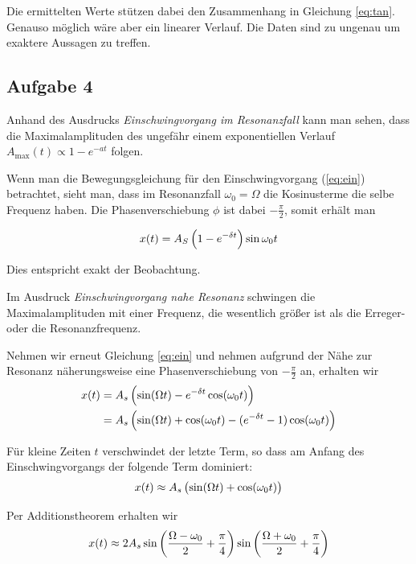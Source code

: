 \documentclass[a4paper,german,12pt,smallheadings]{scrartcl}
\begin{document}
Die ermittelten Werte stützen dabei den Zusammenhang in Gleichung \ref{eq:tan}.
Genauso möglich wäre aber ein linearer Verlauf. Die Daten sind zu ungenau um
exaktere Aussagen zu treffen.

\subsection{Aufgabe 4}
Anhand des Ausdrucks \textit{Einschwingvorgang im Resonanzfall} kann man sehen,
dass die Maximalamplituden des ungefähr einem exponentiellen Verlauf
$A_\text{max}(t) \propto 1 - e^{- a t}$ folgen.

Wenn man die Bewegungsgleichung für den Einschwingvorgang
(\ref{eq:ein}) betrachtet, sieht man, dass im Resonanzfall $\omega_0 = \Omega$
die Kosinusterme die selbe Frequenz haben. Die Phasenverschiebung $\phi$ ist
dabei $-\frac{\pi}{2}$, somit erhält man

\begin{equation}
  x(t) = A_S \del{1 - e^{-\delta t}} \sin \omega_0 t
\end{equation}

Dies entspricht exakt der Beobachtung.

Im Ausdruck \textit{Einschwingvorgang nahe Resonanz} schwingen die
Maximalamplituden mit einer Frequenz, die wesentlich größer ist als die
Erreger- oder die Resonanzfrequenz.

Nehmen wir erneut Gleichung \ref{eq:ein} und nehmen aufgrund der Nähe zur
Resonanz näherungsweise eine Phasenverschiebung von $-\frac{\pi}{2}$ an,
erhalten wir
\begin{align}
  x(t) &= A_s \del{\sin(\Omega t) - e^{-\delta t} \cos(\omega_0 t)} \\
       &= A_s \del{\sin(\Omega t) + \cos(\omega_0 t) - (e^{-\delta t} - 1) \cos(\omega_0 t)}
\end{align}

Für kleine Zeiten $t$ verschwindet der letzte Term, so dass am Anfang des
Einschwingvorgangs der folgende Term dominiert:
\begin{equation}
  x(t) \approx A_s \del{\sin(\Omega t) + \cos(\omega_0 t)}
\end{equation}

Per Additionstheorem erhalten wir
\begin{equation}
  x(t) \approx 2 A_s \sin\del{\frac{\Omega - \omega_0}{2} + \frac{\pi}{4}}
  \sin\del{\frac{\Omega + \omega_0}{2} + \frac{\pi}{4}}
\end{equation}
\end{document}
